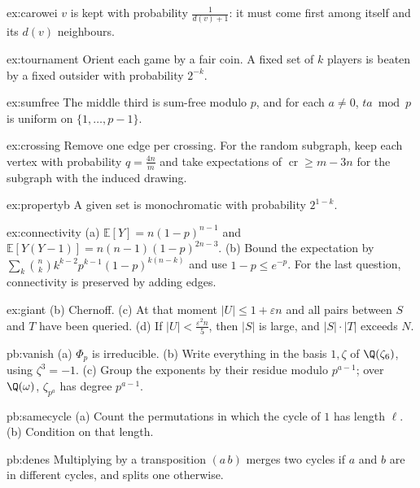 \begin{hint}{ex:carowei}
$v$ is kept with probability $\frac1{d(v)+1}$: it must come first among itself and its $d(v)$ neighbours.
\end{hint}
\begin{hint}{ex:tournament}
Orient each game by a fair coin. A fixed set of $k$ players is beaten by a fixed outsider with probability $2^{-k}$.
\end{hint}
\begin{hint}{ex:sumfree}
The middle third is sum-free modulo $p$, and for each $a\ne0$, $ta\bmod p$ is uniform on $\{1,\dots,p-1\}$.
\end{hint}
\begin{hint}{ex:crossing}
Remove one edge per crossing. For the random subgraph, keep each vertex with probability $q=\frac{4n}m$ and take expectations of
$\operatorname{cr}\ge m-3n$ for the subgraph with the induced drawing.
\end{hint}
\begin{hint}{ex:propertyb}
A given set is monochromatic with probability $2^{1-k}$.
\end{hint}
\begin{hint}{ex:connectivity}
(a) $\mathbb E[Y]=n(1-p)^{n-1}$ and $\mathbb E[Y(Y-1)]=n(n-1)(1-p)^{2n-3}$. (b) Bound the expectation by $\sum_k\binom nkk^{k-2}p^{k-1}(1-p)^{k(n-k)}$ and use $1-p\le e^{-p}$. For the last
question, connectivity is preserved by adding edges.
\end{hint}
\begin{hint}{ex:giant}
(b) Chernoff. (c) At that moment $|U|\le1+\varepsilon n$ and all pairs between $S$ and $T$ have been queried. (d) If $|U|<\frac{\varepsilon^2n}5$, then $|S|$ is large, and
$|S|\cdot|T|$ exceeds $N$.
\end{hint}

\begin{hint}{pb:vanish}
(a) $\Phi_p$ is irreducible. (b) Write everything in the basis $1,\zeta$ of $\Q(\zeta_6)$, using $\zeta^3=-1$. (c) Group the
exponents by their residue modulo $p^{a-1}$; over $\Q(\omega)$, $\zeta_{p^a}$ has degree $p^{a-1}$.
\end{hint}

\begin{hint}{pb:samecycle}
(a) Count the permutations in which the cycle of $1$ has length $\ell$. (b) Condition on that length.
\end{hint}

\begin{hint}{pb:denes}
Multiplying by a transposition $(a\,b)$ merges two cycles if $a$ and $b$ are in different cycles, and splits one otherwise.
\end{hint}

